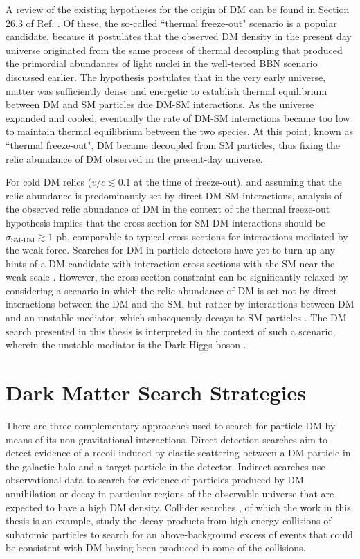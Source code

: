 A review of the existing hypotheses for the origin of DM can be found in Section 26.3 of Ref. \cite{pdg_2018}. Of these, the so-called ``thermal freeze-out" scenario is a popular candidate, because it postulates that the observed DM density in the present day universe originated from the same process of thermal decoupling that produced the primordial abundances of light nuclei in the well-tested BBN scenario discussed earlier. The hypothesis postulates that in the very early universe, matter was sufficiently dense and energetic to establish thermal equilibrium between DM and SM particles due DM-SM interactions. As the universe expanded and cooled, eventually the rate of DM-SM interactions became too low to maintain thermal equilibrium between the two species. At this point, known as ``thermal freeze-out", DM became decoupled from SM particles, thus fixing the relic abundance of DM observed in the present-day universe. 

For cold DM relics (\(v/c\lesssim0.1\) at the time of freeze-out), and assuming that the relic abundance is predominantly set by direct DM-SM interactions, analysis of the observed relic abundance of DM in the context of the thermal freeze-out hypothesis \cite{dm_xsec_2015} implies that the cross section for SM-DM interactions should be \(\sigma_\text{SM-DM}\gtrsim1\) pb, comparable to typical cross sections for interactions mediated by the weak force. Searches for DM in particle detectors have yet to turn up any hints of a DM candidate with interaction cross sections with the SM near the weak scale \cite{wimp_searches_2018}. However, the cross section constraint can be significantly relaxed by considering a scenario in which the relic abundance of DM is set not by direct interactions between the DM and the SM, but rather by interactions between DM and an unstable mediator, which subsequently decays to SM particles \cite{secluded_dm_2008}. The DM search presented in this thesis is interpreted in the context of such a scenario, wherein the unstable mediator is the Dark Higgs boson \cite{Duerr_2016,Duerr2017}.

\section{Dark Matter Search Strategies}

There are three complementary approaches used to search for particle DM by means of its non-gravitational interactions. Direct detection searches \cite{billard2021direct} aim to detect evidence of a recoil induced by elastic scattering between a DM particle in the galactic halo and a target particle in the detector. Indirect searches \cite{CIRELLI_2012, conrad} use observational data to search for evidence of particles produced by DM annihilation or decay in particular regions of the observable universe that are expected to have a high DM density. Collider searches \cite{DM_colliders}, of which the work in this thesis is an example, study the decay products from high-energy collisions of subatomic particles to search for an above-background excess of events that could be consistent with DM having been produced in some of the collisions.

